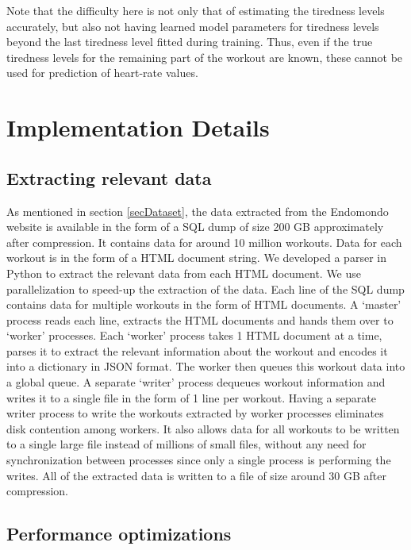 \documentclass{acm_proc_article-sp}
\begin{document}
Note that the difficulty here is not only that of estimating the tiredness levels accurately, but also not having learned model parameters for tiredness levels beyond the last tiredness level fitted during training. Thus, even if the true tiredness levels for the remaining part of the workout are known, these cannot be used for prediction of heart-rate values.

\section{Implementation Details}
\label{secImplementationDetails}

\subsection{Extracting relevant data}
As mentioned in section \ref{secDataset}, the data extracted from the Endomondo website \cite{endomondo} is available in the form of a SQL dump of size 200 GB approximately after compression. It contains data for around 10 million workouts. Data for each workout is in the form of a HTML document string. We developed a parser in Python to extract the relevant data from each HTML document.  We use parallelization to speed-up the extraction of the data. Each line of the SQL dump contains data for multiple workouts in the form of HTML documents. A `master' process reads each line, extracts the HTML documents and hands them over to `worker' processes. Each `worker' process takes 1 HTML document at a time, parses it to extract the relevant information about the workout and encodes it into a dictionary in JSON format. The worker then queues this workout data into a global queue. A separate `writer' process dequeues workout information and writes it to a single file in the form of 1 line per workout. Having a separate writer process to write the workouts extracted by worker processes eliminates disk contention among workers. It also allows data for all workouts to be written to a single large file instead of millions of small files, without any need for synchronization between processes since only a single process is performing the writes. All of the extracted data is written to a file of size around 30 GB after compression.

\subsection{Performance optimizations}
\end{document}
